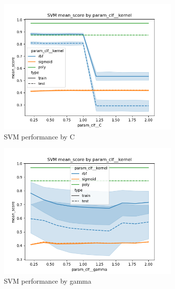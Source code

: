 \documentclass[12pt]{article}
\begin{document}
\begin{figure}
    \begin{subfigure}{.5\textwidth}
      \includegraphics[width=.95\textwidth]{../results/svm/param_clf__kernel_mean_score_param_clf__C.png}
      \caption{SVM performance by C}
      \end{subfigure}%
    \begin{subfigure}{.5\textwidth}
      \includegraphics[width=.95\textwidth]{../results/svm/param_clf__kernel_mean_score_param_clf__gamma.png}
      \caption{SVM performance by gamma}
    \end{subfigure}
    \begin{subfigure}{.5\textwidth}

\end{subfigure}
\end{figure}
\end{document}
